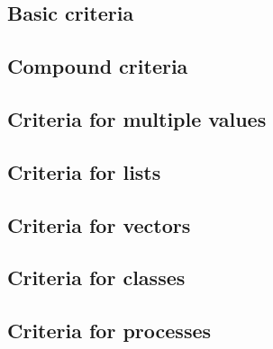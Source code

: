 \documentclass{article}
\begin{document}
\subsection{Basic criteria}












\subsection{Compound criteria}







\subsection{Criteria for multiple values}



\subsection{Criteria for lists}



\subsection{Criteria for vectors}

\subsection{Criteria for classes}

\subsection{Criteria for processes}

\end{document}
